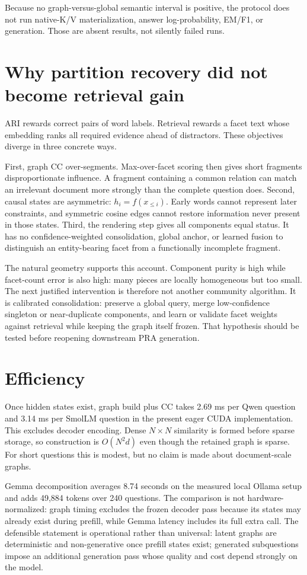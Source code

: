 \documentclass[11pt]{article}
\begin{document}
Because no graph-versus-global semantic interval is positive, the protocol does not run native-K/V materialization, answer log-probability, EM/F1, or generation. Those are absent results, not silently failed runs.

\section{Why partition recovery did not become retrieval gain}
ARI rewards correct pairs of word labels. Retrieval rewards a facet text whose embedding ranks all required evidence ahead of distractors. These objectives diverge in three concrete ways.

First, graph CC over-segments. Max-over-facet scoring then gives short fragments disproportionate influence. A fragment containing a common relation can match an irrelevant document more strongly than the complete question does. Second, causal states are asymmetric: $h_i=f(x_{\le i})$. Early words cannot represent later constraints, and symmetric cosine edges cannot restore information never present in those states. Third, the rendering step gives all components equal status. It has no confidence-weighted consolidation, global anchor, or learned fusion to distinguish an entity-bearing facet from a functionally incomplete fragment.

The natural geometry supports this account. Component purity is high while facet-count error is also high: many pieces are locally homogeneous but too small. The next justified intervention is therefore not another community algorithm. It is calibrated consolidation: preserve a global query, merge low-confidence singleton or near-duplicate components, and learn or validate facet weights against retrieval while keeping the graph itself frozen. That hypothesis should be tested before reopening downstream PRA generation.

\section{Efficiency}
Once hidden states exist, graph build plus CC takes 2.69 ms per Qwen question and 3.14 ms per SmolLM question in the present eager CUDA implementation. This excludes decoder encoding. Dense $N\times N$ similarity is formed before sparse storage, so construction is $O(N^2d)$ even though the retained graph is sparse. For short questions this is modest, but no claim is made about document-scale graphs.

Gemma decomposition averages 8.74 seconds on the measured local Ollama setup and adds 49,884 tokens over 240 questions. The comparison is not hardware-normalized: graph timing excludes the frozen decoder pass because its states may already exist during prefill, while Gemma latency includes its full extra call. The defensible statement is operational rather than universal: latent graphs are deterministic and non-generative once prefill states exist; generated subquestions impose an additional generation pass whose quality and cost depend strongly on the model.
\end{document}
